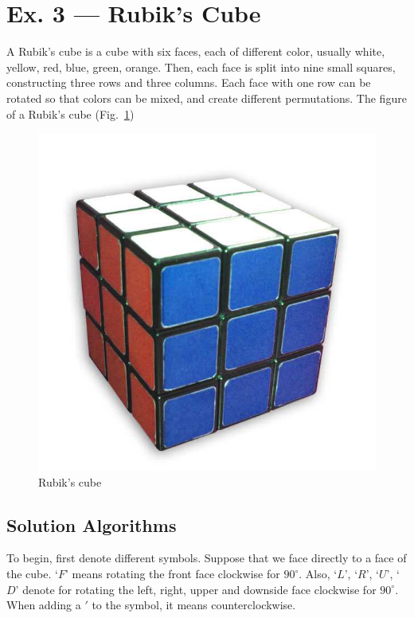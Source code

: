 \documentclass[12pt, a4paper]{article}
\begin{document}
\newpage

\section*{Ex. 3 --- Rubik’s Cube}
A Rubik's cube is a cube with six faces, each of different color, usually white, yellow, red, blue, green, orange. 
Then, each face is split into nine small squares, constructing three rows and three columns. 
Each face with one row can be rotated so that colors can be mixed, and create different permutations. 
The figure of a Rubik's cube (Fig.~\ref{fig:cube})

\begin{figure}[!htb]
    \centering
    \includegraphics{cube}
    \caption{Rubik's cube}
    \label{fig:cube}
\end{figure}

\subsection*{Solution Algorithms}
To begin, first denote different symbols. Suppose that we face directly to a face of the cube. `$F$' means rotating the front face clockwise for $90^\circ$. 
Also, `$L$', `$R$', `$U$', `$D$' denote for rotating the left, right, upper and downside face clockwise for $90^\circ$. When adding a $'$ to the symbol, it means counterclockwise. 
\end{document}
